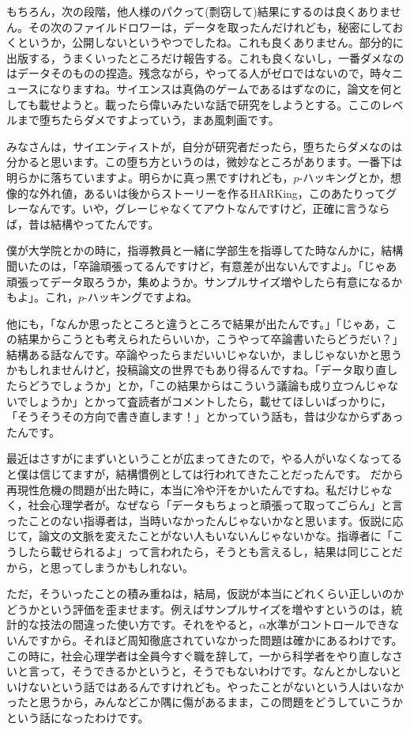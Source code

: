 \documentclass{ltjsbook}
\begin{document}
もちろん，次の段階，他人様のパクって(剽窃して)結果にするのは良くありません。その次のファイルドロワーは，データを取ったんだけれども，秘密にしておくというか，公開しないというやつでしたね。これも良くありません。部分的に出版する，うまくいったところだけ報告する。これも良くないし，一番ダメなのはデータそのものの捏造。残念ながら，やってる人がゼロではないので，時々ニュースになりますね。サイエンスは真偽のゲームであるはずなのに，論文を何としても載せようと。載ったら偉いみたいな話で研究をしようとする。ここのレベルまで堕ちたらダメですよっていう，まあ風刺画です。

みなさんは，サイエンティストが，自分が研究者だったら，堕ちたらダメなのは分かると思います。この堕ち方というのは，微妙なところがあります。一番下は明らかに落ちていますよ。明らかに真っ黒ですけれども，$p$-ハッキングとか，想像的な外れ値，あるいは後からストーリーを作るHARKing，このあたりってグレーなんです。いや，グレーじゃなくてアウトなんですけど，正確に言うならば，昔は結構やってたんです。

僕が大学院とかの時に，指導教員と一緒に学部生を指導してた時なんかに，結構聞いたのは，「卒論頑張ってるんですけど，有意差が出ないんですよ」。「じゃあ頑張ってデータ取ろうか，集めようか。サンプルサイズ増やしたら有意になるかもよ」。これ，$p$-ハッキングですよね。

他にも，「なんか思ったところと違うところで結果が出たんです。」「じゃあ，この結果からこうとも考えられたらいいか，こうやって卒論書いたらどうだい？」結構ある話なんです。卒論やったらまだいいじゃないか，ましじゃないかと思うかもしれませんけど，投稿論文の世界でもあり得るんですね。「データ取り直したらどうでしょうか」とか，「この結果からはこういう議論も成り立つんじゃないでしょうか」とかって査読者がコメントしたら，載せてほしいばっかりに，「そうそうその方向で書き直します！」とかっていう話も，昔は少なからずあったんです。

最近はさすがにまずいということが広まってきたので，やる人がいなくなってると僕は信じてますが，結構慣例としては行われてきたことだったんです。
だから再現性危機の問題が出た時に，本当に冷や汗をかいたんですね。私だけじゃなく，社会心理学者が。なぜなら「データもちょっと頑張って取ってごらん」と言ったことのない指導者は，当時いなかったんじゃないかなと思います。仮説に応じて，論文の文脈を変えたことがない人もいないんじゃないかな。指導者に「こうしたら載せられるよ」って言われたら，そうとも言えるし，結果は同じことだから，と思ってしまうかもしれない。

ただ，そういったことの積み重ねは，結局，仮説が本当にどれくらい正しいのかどうかという評価を歪ませます。例えばサンプルサイズを増やすというのは，統計的な技法の間違った使い方です。それをやると，$\alpha$水準がコントロールできないんですから。それほど周知徹底されていなかった問題は確かにあるわけです。この時に，社会心理学者は全員今すぐ職を辞して，一から科学者をやり直しなさいと言って，そうできるかというと，そうでもないわけです。なんとかしないといけないという話ではあるんですけれども。やったことがないという人はいなかったと思うから，みんなどこか隅に傷があるまま，この問題をどうしていこうかという話になったわけです。
\end{document}
